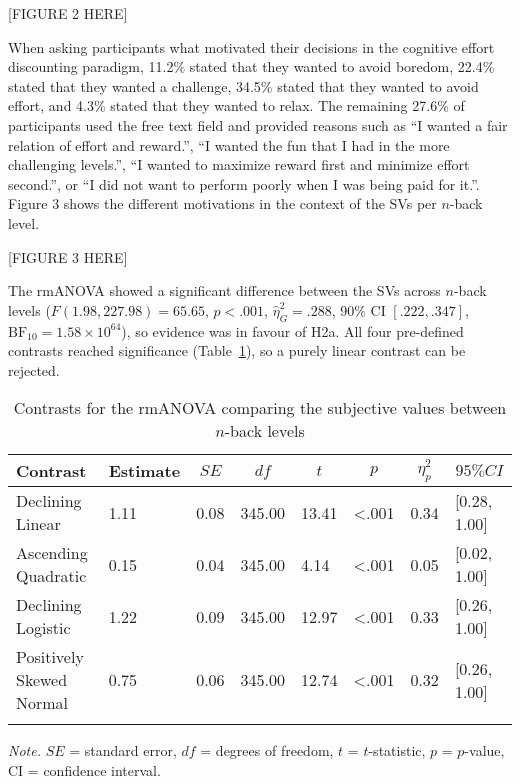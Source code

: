 \documentclass[
  man,floatsintext]{apa6}
\begin{document}
{[}FIGURE 2 HERE{]}

When asking participants what motivated their decisions in the cognitive effort discounting paradigm, 11.2\% stated that they wanted to avoid boredom, 22.4\% stated that they wanted a challenge, 34.5\% stated that they wanted to avoid effort, and 4.3\% stated that they wanted to relax.
The remaining 27.6\% of participants used the free text field and provided reasons such as ``I wanted a fair relation of effort and reward.'', ``I wanted the fun that I had in the more challenging levels.'', ``I wanted to maximize reward first and minimize effort second.'', or ``I did not want to perform poorly when I was being paid for it.''.
Figure 3 shows the different motivations in the context of the SVs per \(n\)-back level.

{[}FIGURE 3 HERE{]}

The rmANOVA showed a significant difference between the SVs across \(n\)-back levels (\(F(1.98, 227.98) = 65.65\), \(p < .001\), \(\hat{\eta}^2_G = .288\), 90\% CI \([.222, .347]\), \(\mathrm{BF}_{\textrm{10}} = 1.58 \times 10^{64}\)), so evidence was in favour of H2a.
All four pre-defined contrasts reached significance (Table~\ref{tab:H2a-contrasts}), so a purely linear contrast can be rejected.

\begin{table}[H]

\begin{center}
\begin{threeparttable}

\caption{\label{tab:H2a-contrasts}Contrasts for the rmANOVA comparing the subjective values between $n$-back levels}

\begin{tabular}{llllllll}
\toprule
Contrast & \multicolumn{1}{c}{Estimate} & \multicolumn{1}{c}{$SE$} & \multicolumn{1}{c}{$df$} & \multicolumn{1}{c}{$t$} & \multicolumn{1}{c}{$p$} & \multicolumn{1}{c}{$\eta_{p}^{2}$} & \multicolumn{1}{c}{$95\% CI$}\\
\midrule
Declining Linear & 1.11 & 0.08 & 345.00 & 13.41 & <.001 & 0.34 & {}[0.28, 1.00]\\
Ascending Quadratic & 0.15 & 0.04 & 345.00 & 4.14 & <.001 & 0.05 & {}[0.02, 1.00]\\
Declining Logistic & 1.22 & 0.09 & 345.00 & 12.97 & <.001 & 0.33 & {}[0.26, 1.00]\\
Positively Skewed Normal & 0.75 & 0.06 & 345.00 & 12.74 & <.001 & 0.32 & {}[0.26, 1.00]\\
\bottomrule
\addlinespace
\end{tabular}

\begin{tablenotes}[para]
\normalsize{\textit{Note.} $SE$ = standard error, $df$ = degrees of freedom, $t$ = $t$-statistic, $p$ = $p$-value, CI = confidence interval.}
\end{tablenotes}

\end{threeparttable}
\end{center}

\end{table}
\end{document}
